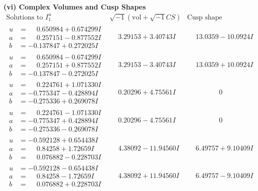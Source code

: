 \documentclass[1p]{elsarticle_modified}
\theoremstyle{definition}
\newcommand{\I}{\sqrt{-1}}
\begin{document}
\newpage\flushleft \textbf{(vi) Complex Volumes and Cusp Shapes}
$$\begin{array}{c|c|c}  
\text{Solutions to }I^u_{1}& \I (\text{vol} + \sqrt{-1}CS) & \text{Cusp shape}\\
 \hline 
\begin{aligned}
u &= \phantom{-}0.650984 + 0.674299 I \\
a &= \phantom{-}0.257151 - 0.877552 I \\
b &= -0.137847 + 0.272025 I\end{aligned}
 & \phantom{-}3.29153 + 3.40743 I & \phantom{-}13.0359 - 10.0924 I \\ \hline\begin{aligned}
u &= \phantom{-}0.650984 - 0.674299 I \\
a &= \phantom{-}0.257151 + 0.877552 I \\
b &= -0.137847 - 0.272025 I\end{aligned}
 & \phantom{-}3.29153 - 3.40743 I & \phantom{-}13.0359 + 10.0924 I \\ \hline\begin{aligned}
u &= \phantom{-}0.224761 + 1.071330 I \\
a &= -0.775347 - 0.428894 I \\
b &= -0.275336 + 0.269078 I\end{aligned}
 & \phantom{-}0.20296 + 4.75561 I & \phantom{-0.000000 } 0 \\ \hline\begin{aligned}
u &= \phantom{-}0.224761 - 1.071330 I \\
a &= -0.775347 + 0.428894 I \\
b &= -0.275336 - 0.269078 I\end{aligned}
 & \phantom{-}0.20296 - 4.75561 I & \phantom{-0.000000 } 0 \\ \hline\begin{aligned}
u &= -0.592128 + 0.654438 I \\
a &= \phantom{-}0.84258 + 1.72659 I \\
b &= \phantom{-}0.076882 - 0.228703 I\end{aligned}
 & \phantom{-}4.38092 - 11.94560 I & \phantom{-}6.49757 + 9.10409 I \\ \hline\begin{aligned}
u &= -0.592128 - 0.654438 I \\
a &= \phantom{-}0.84258 - 1.72659 I \\
b &= \phantom{-}0.076882 + 0.228703 I\end{aligned}
 & \phantom{-}4.38092 + 11.94560 I & \phantom{-}6.49757 - 9.10409 I \\ \hline\begin{aligned}

\end{aligned}
\end{array}$$
\end{document}
